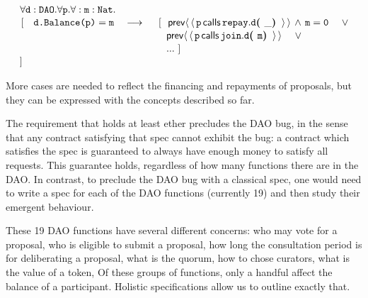 \noindent
$\strut \hspace{0.5cm} \forall {\mbox{\tt{d}}}:{\mbox{\tt{DAO}}}.\forall {\mbox{\tt{p}}}.\forall:{\mbox{\tt{m}}}:{\mbox{\tt{Nat}}}.$\\
$\strut \hspace{0.5cm} [ \ \ \  \prg{d.Balance(p)}=\prg{m} \ \ \  \longrightarrow   
 \ \  \ \ 
  [ \  \ \Prev{\Calls{\prg{p}}{\prg{d}}{\prg{repay}}{\_}}\, \wedge\, \prg{m}=\prg{0} \ \ \ \ \vee $\\
$\strut \hspace{5.7cm}      
\Prev{\Calls{\prg{p}}{\prg{d}}{\prg{join}}{\prg{m}}}  \ \ \ \ \vee   $\\
 $\strut \hspace{5.7cm}  ... \  ]$ \\
%                         
$\strut \hspace{0.5cm} ] $
  


More cases are needed to reflect the financing and repayments of proposals, but they can be expressed with the concepts described so far.


 

\noindent
The requirement that  holds at least  ether precludes the DAO bug,
in the sense that  any contract satisfying that spec cannot exhibit  the  bug:   a contract
which satisfies the spec  is guaranteed to always have enough money to satisfy all  requests.
This guarantee  holds, regardless of how many functions there are in the DAO.
In contrast, to preclude the DAO  bug with a classical spec, one would need to write a spec for each of the
DAO functions (currently 19) and then study their emergent  behaviour.

These 19 DAO functions   have several different concerns:
who may vote   for a proposal, who is eligible to submit a proposal,
how long the consultation period is for deliberating a proposal, what
is the quorum, how to chose curators, what is the value of a token,
Of these groups of functions, only  a handful affect the balance of a
participant. Holistic specifications allow us to outline exactly that.
 
